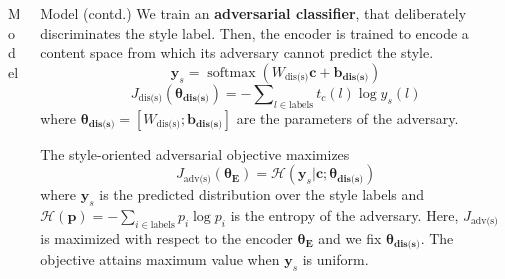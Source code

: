 \documentclass[final]{beamer}
\newlength{\onecolwid}
\newlength{\twocolwid}
\newcommand{\loss}[1]{J_{\text{#1}}}
\newcommand{\nnweight}[1]{\bm{\theta_{\text{#1}}}}
\newcommand{\weight}[1]{W_{\text{#1}}}
\newcommand{\bias}[1]{\bm{b_{\text{#1}}}}
\begin{document}
\begin{frame}[t]
\begin{columns}[t]
\begin{column}{\twocolwid}
\begin{columns}[t,totalwidth=\twocolwid]
\begin{column}{\onecolwid}
\begin{block}{Model}
                    \end{block}


                \end{column} %

                \begin{column}{\onecolwid}\vspace{-.6in} %


                    \begin{block}{Model (contd.)}
                        We train an \textbf{adversarial classifier}, that deliberately discriminates the style label.
                        Then, the encoder is trained to encode a content space from which its adversary cannot predict the style.
                        \begin{equation*}
                            \bm y_s                          = \operatorname{softmax}(\weight{dis(s)} \bm c + \bias{dis(s)})
                        \end{equation*}
                        \begin{equation*}
                            \loss{dis(s)}(\nnweight{dis(s)}) = - \sum\nolimits_{l\in\text{labels}} t_c(l)\log y_s(l)
                        \end{equation*}
                        where $\nnweight{dis(s)}=[\weight{dis(s)}; \bias{dis(s)}]$ are the parameters of the adversary.

                        The style-oriented adversarial objective maximizes
                        \begin{equation*}
                            \loss{adv(s)}(\nnweight{E})=\mathcal{H}(\bm y_s|\bm c; \nnweight{dis(s)})
                        \end{equation*}
                        where $\bm y_s$ is the predicted distribution over the style labels and $\mathcal{H}(\bm p)=-\sum_{i\in\text{labels}}p_i\log p_i$ is the entropy of the adversary. Here, $\loss{adv(s)}$ is maximized with respect to the encoder $\nnweight{E}$ and we fix $\nnweight{dis(s)}$. The objective attains maximum value when $\bm y_s$ is uniform.


\end{block}
\end{column}
\end{columns}
\end{column}
\end{columns}
\end{frame}
\end{document}
